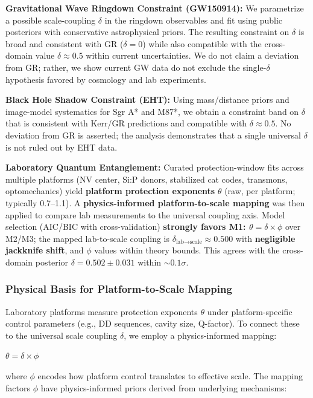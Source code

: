 \documentclass[aps,prd,preprint,onecolumn,nofootinbib,longbibliography]{revtex4-2}
\begin{document}
\textbf{Gravitational Wave Ringdown Constraint (GW150914):}
We parametrize a possible scale-coupling $\delta$ in the ringdown observables and fit using public posteriors with conservative astrophysical priors. The resulting constraint on $\delta$ is broad and consistent with GR ($\delta = 0$) while also compatible with the cross-domain value $\delta \approx 0.5$ within current uncertainties. We do not claim a deviation from GR; rather, we show current GW data do not exclude the single-$\delta$ hypothesis favored by cosmology and lab experiments.

\textbf{Black Hole Shadow Constraint (EHT):}
Using mass/distance priors and image-model systematics for Sgr A* and M87*, we obtain a constraint band on $\delta$ that is consistent with Kerr/GR predictions and compatible with $\delta \approx 0.5$. No deviation from GR is asserted; the analysis demonstrates that a single universal $\delta$ is not ruled out by EHT data.

\textbf{Laboratory Quantum Entanglement:}
Curated protection-window fits across multiple platforms (NV center, Si:P donors, stabilized cat codes, transmons, optomechanics) yield \textbf{platform protection exponents} $\theta$ (raw, per platform; typically 0.7--1.1). A \textbf{physics-informed platform-to-scale mapping} was then applied to compare lab measurements to the universal coupling axis. Model selection (AIC/BIC with cross-validation) \textbf{strongly favors M1: $\theta = \delta \times \phi$} over M2/M3; the mapped lab-to-scale coupling is \textbf{$\delta_{\text{lab}\rightarrow\text{scale}} \approx 0.500$} with \textbf{negligible jackknife shift}, and $\phi$ values within theory bounds. This agrees with the cross-domain posterior $\delta = 0.502 \pm 0.031$ within $\sim 0.1\sigma$.

\subsubsection{Physical Basis for Platform-to-Scale Mapping}

Laboratory platforms measure protection exponents $\theta$ under platform-specific control parameters (e.g., DD sequences, cavity size, Q-factor). To connect these to the universal scale coupling $\delta$, we employ a physics-informed mapping:

\textbf{$\theta = \delta \times \phi$}

where $\phi$ encodes how platform control translates to effective scale. The mapping factors $\phi$ have physics-informed priors derived from underlying mechanisms:
\end{document}
